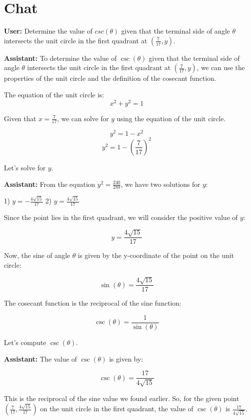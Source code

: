 \documentclass{article}
\begin{document}
\section*{Chat}

\textbf{User:} Determine the value of \( csc(\theta) \) given that the terminal side of angle \( \theta \) intersects the unit circle in the first quadrant at \( \left(\frac{7}{17},y\right) \).

\textbf{Assistant:} To determine the value of \( \csc(\theta) \) given that the terminal side of angle \( \theta \) intersects the unit circle in the first quadrant at \( \left(\frac{7}{17},y\right) \), we can use the properties of the unit circle and the definition of the cosecant function.

The equation of the unit circle is:
\[ x^2 + y^2 = 1 \]

Given that \( x = \frac{7}{17} \), we can solve for \( y \) using the equation of the unit circle.

\[ y^2 = 1 - x^2 \]
\[ y^2 = 1 - \left(\frac{7}{17}\right)^2 \]

Let's solve for \( y \).

\textbf{Assistant:} From the equation \( y^2 = \frac{240}{289} \), we have two solutions for \( y \):

1) \( y = -\frac{4\sqrt{15}}{17} \)
2) \( y = \frac{4\sqrt{15}}{17} \)

Since the point lies in the first quadrant, we will consider the positive value of \( y \):

\[ y = \frac{4\sqrt{15}}{17} \]

Now, the sine of angle \( \theta \) is given by the y-coordinate of the point on the unit circle:

\[ \sin(\theta) = \frac{4\sqrt{15}}{17} \]

The cosecant function is the reciprocal of the sine function:

\[ \csc(\theta) = \frac{1}{\sin(\theta)} \]

Let's compute \( \csc(\theta) \).

\textbf{Assistant:} The value of \( \csc(\theta) \) is given by:

\[ \csc(\theta) = \frac{17}{4\sqrt{15}} \]

This is the reciprocal of the sine value we found earlier. So, for the given point \( \left(\frac{7}{17}, \frac{4\sqrt{15}}{17}\right) \) on the unit circle in the first quadrant, the value of \( \csc(\theta) \) is \( \frac{17}{4\sqrt{15}} \).
\end{document}
